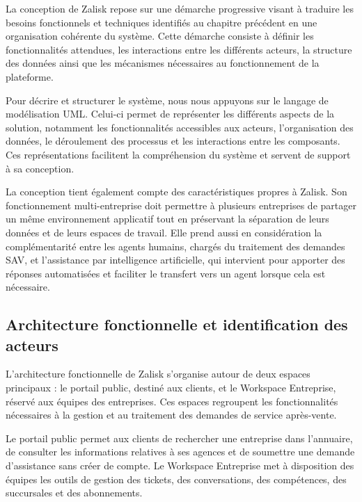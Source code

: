 \documentclass[12pt, a4paper]{report}
\begin{document}
La conception de Zalisk repose sur une démarche progressive visant à traduire les besoins fonctionnels et techniques identifiés au chapitre précédent en une organisation cohérente du système. Cette démarche consiste à définir les fonctionnalités attendues, les interactions entre les différents acteurs, la structure des données ainsi que les mécanismes nécessaires au fonctionnement de la plateforme.

Pour décrire et structurer le système, nous nous appuyons sur le langage de modélisation UML. Celui-ci permet de représenter les différents aspects de la solution, notamment les fonctionnalités accessibles aux acteurs, l'organisation des données, le déroulement des processus et les interactions entre les composants. Ces représentations facilitent la compréhension du système et servent de support à sa conception.

La conception tient également compte des caractéristiques propres à Zalisk. Son fonctionnement multi-entreprise doit permettre à plusieurs entreprises de partager un même environnement applicatif tout en préservant la séparation de leurs données et de leurs espaces de travail. Elle prend aussi en considération la complémentarité entre les agents humains, chargés du traitement des demandes SAV, et l'assistance par intelligence artificielle, qui intervient pour apporter des réponses automatisées et faciliter le transfert vers un agent lorsque cela est nécessaire.

\subsection{Architecture fonctionnelle et identification des acteurs}
\label{subsec:architecture-fonctionnelle-acteurs}

L'architecture fonctionnelle de Zalisk s'organise autour de deux espaces principaux : le portail public, destiné aux clients, et le Workspace Entreprise, réservé aux équipes des entreprises. Ces espaces regroupent les fonctionnalités nécessaires à la gestion et au traitement des demandes de service après-vente.

Le portail public permet aux clients de rechercher une entreprise dans l'annuaire, de consulter les informations relatives à ses agences et de soumettre une demande d'assistance sans créer de compte. Le Workspace Entreprise met à disposition des équipes les outils de gestion des tickets, des conversations, des compétences, des succursales et des abonnements.
\end{document}
